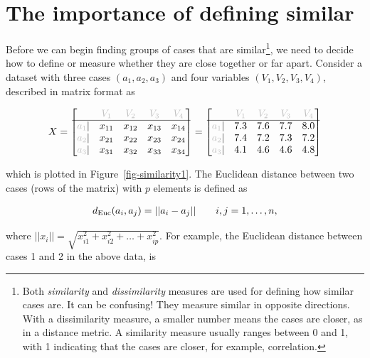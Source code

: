 \documentclass[
  letterpaper,
]{krantz}
\begin{document}
\section{The importance of defining similar}\label{sec-clust-bg}

Before we can begin finding groups of cases that are similar\footnote{Both
  \emph{similarity} and \emph{dissimilarity} measures are used for
  defining how similar cases are. It can be confusing! They measure
  similar in opposite directions. With a dissimilarity measure, a
  smaller number means the cases are closer, as in a distance metric. A
  similarity measure usually ranges between 0 and 1, with 1 indicating
  that the cases are closer, for example, correlation.}, we need to
decide how to define or measure whether they are close together or far
apart. Consider a dataset with three cases \((a_1, a_2, a_3)\) and four
variables \((V_1, V_2, V_3, V_4)\), described in matrix format as

\begin{align*}
X = \begin{bmatrix}
& {\color{grey} V_1} & {\color{grey} V_2} & {\color{grey} V_3} & {\color{grey} V_4} \\\hline
{\color{grey} a_1} | & x_{11} & x_{12} & x_{13} & x_{14} \\
{\color{grey} a_2} | & x_{21} & x_{22} & x_{23} & x_{24} \\
{\color{grey} a_3} | & x_{31} & x_{32} & x_{33} & x_{34}    
\end{bmatrix}
=  \begin{bmatrix}
& {\color{grey} V_1} & {\color{grey} V_2} & {\color{grey} V_3} & {\color{grey} V_4} \\\hline
{\color{grey} a_1} | & 7.3 & 7.6 & 7.7 & 8.0 \\
{\color{grey} a_2} | & 7.4 & 7.2 & 7.3 & 7.2 \\
{\color{grey} a_3} | & 4.1 & 4.6 & 4.6 & 4.8 
\end{bmatrix}
\end{align*}

\noindent which is plotted in Figure~\ref{fig-similarity1}. The
Euclidean distance between two cases (rows of the matrix) with \(p\)
elements is defined as

\begin{align*}
d_{\rm Euc}(a_i,a_j) = ||a_i-a_j|| 
~~~~~~i,j=1,\dots, n,
\end{align*}

\noindent where \(||x_i||=\sqrt{x_{i1}^2+x_{i2}^2+\dots +x_{ip}^2}\).
For example, the Euclidean distance between cases 1 and 2 in the above
data, is
\end{document}
